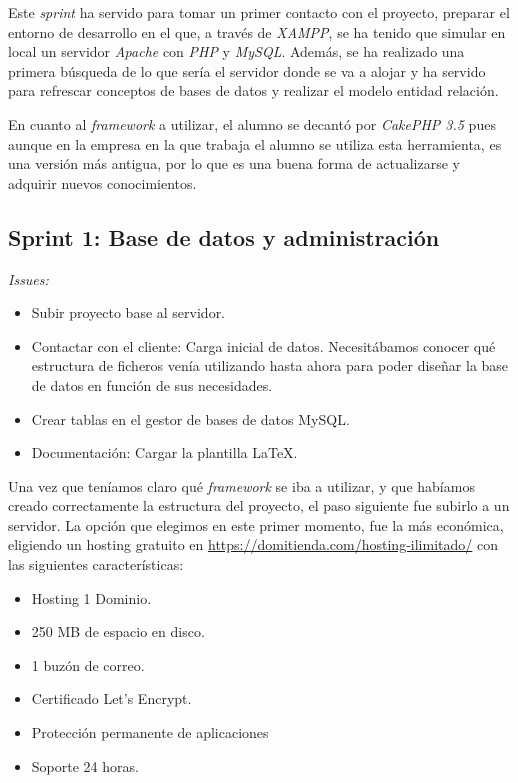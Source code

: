 Este \textit{sprint} ha servido para tomar un primer contacto con el proyecto, preparar el entorno de desarrollo en el que, a través de \textit{XAMPP}, se ha tenido que simular en local un servidor \textit{Apache} con \textit{PHP} y \textit{MySQL}. Además, se ha realizado una primera búsqueda de lo que sería el servidor donde se va a alojar y ha servido para refrescar conceptos de bases de datos y realizar el modelo entidad relación.

En cuanto al \textit{framework} a utilizar, el alumno se decantó por \textit{CakePHP 3.5} pues aunque en la empresa en la que trabaja el alumno se utiliza esta herramienta, es una versión más antigua, por lo que es una buena forma de actualizarse y adquirir nuevos conocimientos. 

\subsection{Sprint 1: Base de datos y administración}

\textit{Issues:}
\begin{itemize}
	\item Subir proyecto base al servidor.
	\item Contactar con el cliente: Carga inicial de datos. Necesitábamos conocer qué estructura de ficheros venía utilizando hasta ahora para poder diseñar la base de datos en función de sus necesidades. 
	\item Crear tablas en el gestor de bases de datos MySQL.
	\item Documentación: Cargar la plantilla \LaTeX.
\end{itemize}

Una vez que teníamos claro qué \textit{framework} se iba a utilizar, y que habíamos creado correctamente la estructura del proyecto, el paso siguiente fue subirlo a un servidor. La opción que elegimos en este primer momento, fue la más económica, eligiendo un hosting gratuito en \url{https://domitienda.com/hosting-ilimitado/} con las siguientes características:

\begin{itemize}
	\item Hosting 1 Dominio.
	\item 250 MB de espacio en disco. 
	\item 1 buzón de correo.
	\item Certificado Let's Encrypt.
	\item Protección permanente de aplicaciones
	\item Soporte 24 horas.
\end{itemize}

